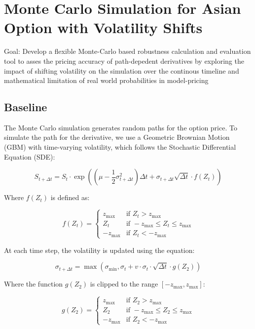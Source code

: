 \documentclass{article}
\begin{document}
\section*{Monte Carlo Simulation for Asian Option with Volatility Shifts}
Goal: Develop a flexible Monte-Carlo based robustness calculation and evaluation tool to asses the pricing accuracy of path-depedent derivatives by exploring
the impact of shifting volatility on the simulation over the continous timeline and mathematical limitation of real world probabilities in model-pricing

\subsection{Baseline}

The Monte Carlo simulation generates random paths for the option price. To simulate the path for the derivative, we use a Geometric Brownian Motion (GBM) with time-varying volatility, which follows the Stochastic Differential Equation (SDE):

\[
S_{t + \Delta t} = S_t \cdot \exp\left( \left( \mu - \frac{1}{2} \sigma_{t + \Delta t}^2 \right) \Delta t + \sigma_{t + \Delta t} \sqrt{\Delta t} \cdot f(Z_t) \right)
\]

Where \( f(Z_t) \) is defined as:

\[
f(Z_t) = 
\begin{cases} 
z_{\text{max}} & \text{if } Z_t > z_{\text{max}} \\
Z_t & \text{if } -z_{\text{max}} \leq Z_t \leq z_{\text{max}} \\
-z_{\text{max}} & \text{if } Z_t < -z_{\text{max}}
\end{cases}
\]

At each time step, the volatility is updated using the equation:

\[
\sigma_{t + \Delta t} = \max\left( \sigma_{\text{min}}, \sigma_t + v \cdot \sigma_t \cdot \sqrt{\Delta t} \cdot g(Z_2) \right)
\]

Where the function \( g(Z_2) \) is clipped to the range \( [-z_{\text{max}}, z_{\text{max}}] \):

\[
g(Z_2) = 
\begin{cases} 
z_{\text{max}} & \text{if } Z_2 > z_{\text{max}} \\
Z_2 & \text{if } -z_{\text{max}} \leq Z_2 \leq z_{\text{max}} \\
-z_{\text{max}} & \text{if } Z_2 < -z_{\text{max}}
\end{cases}
\]
\end{document}
